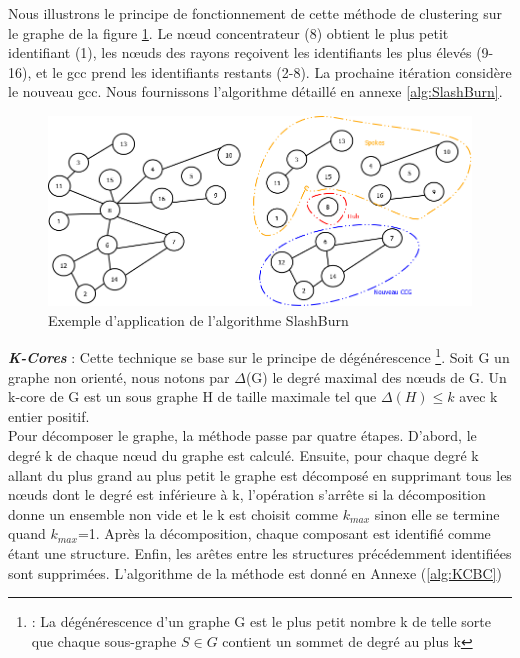 \documentclass[a4paper,oneside,12pt]{report}
\theoremstyle{definition}
\begin{document}
\begin{enumerate}
Nous illustrons le principe de fonctionnement de cette méthode de clustering sur le graphe de la figure \ref{Img:slashb}. Le nœud concentrateur (8) obtient le plus petit identifiant (1), les nœuds des rayons reçoivent les identifiants les plus élevés (9-16), et le \gls{gcc} prend les identifiants restants (2-8). La prochaine itération considère le nouveau \gls{gcc}. Nous fournissons l'algorithme détaillé en annexe \ref{alg:SlashBurn}.

\begin{figure}[H]
	\centering
	
	\includegraphics[scale=0.25]{ressources/image/slashburn.png}
	\caption{Exemple d'application de l'algorithme SlashBurn}
	\label{Img:slashb}
 \end{figure}

\textbf{\textit{K-Cores}} : Cette technique se base sur le principe de dégénérescence \footnote{: La dégénérescence d’un graphe G est le plus petit nombre k de
 telle sorte que chaque sous-graphe $S \in G$ contient un sommet de degré au plus k}. Soit G un graphe non orienté, nous notons par $\Delta$(G) le degré maximal des nœuds de G. Un k-core de G est un sous graphe H de taille maximale tel que $\Delta(H) \le k$ avec k entier positif.\\
Pour décomposer le graphe, la méthode passe par quatre étapes. D'abord, le degré k de chaque nœud du graphe est calculé. Ensuite, pour chaque degré k allant du plus grand au plus petit le graphe est décomposé en supprimant tous les nœuds dont le degré est inférieure à k, l'opération s'arrête si la décomposition donne un ensemble non vide et le k est choisit comme $k_{max}$ sinon elle se termine quand $k_{max}$=1. Après la décomposition, chaque composant est identifié comme étant une structure. Enfin, les arêtes entre les structures précédemment identifiées sont supprimées. L'algorithme de la méthode est donné en Annexe (\ref{alg:KCBC})\\



\end{enumerate}
\end{document}
